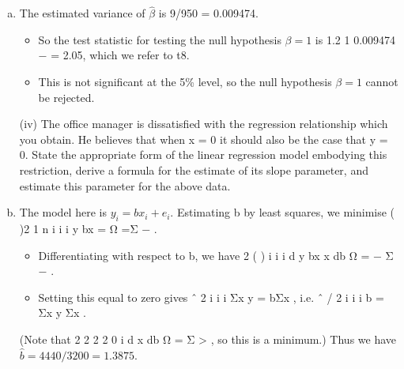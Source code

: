 \documentclass[a4paper,12pt]{article}
\begin{document}
\begin{enumerate}[(a)]
\begin{itemize}
\item so the line is
y = 4 + 1.2x.
\item 
The total sum of squares is ( ) ( )2
2 2 1440
10
i
yy i i
y
S = y − y = y − = Σ Σ Σ .

\item The sum of squares for regression is ˆ
xy β S (or 2 / xy xx S S ) = 1368.
\item Therefore the residual sum of squares is 1440 – 1368 = 72.
\item This has 8 degrees of freedom, so the residual mean square ($\hat{\sigma}^2$ ) is 72/8 = 9.
\item The coefficient of determination $R^2 = 1368/1440 = 0.95$ (usually given as 95\%).
\end{itemize}
\newpage
\begin{framed}

(iii) Given that the variance of the slope estimate is Σ( − )2
2
x x i
σ , where x denotes
the sample mean benchmark time, test at the 5%
hypothesis that the slope of this regression is 1.
(4)

\end{framed}
\item  The estimated variance of $\hat{\beta}$ is 9/950 = 0.009474. 
\begin{itemize}
    \item So the test statistic for
testing the null hypothesis $\beta = 1$ is 1.2 1
0.009474
− = 2.05, which we refer to t8.
\item This is not significant at the 5\% level, so the null hypothesis $\beta = 1$ cannot be rejected.
\end{itemize}
\newpage
\begin{framed}
(iv) The office manager is dissatisfied with the regression relationship which you obtain. He believes that when x = 0 it should also be the case that y = 0. State the appropriate form of the linear regression model embodying this restriction,
derive a formula for the estimate of its slope parameter, and estimate this parameter for the above data.
\end{framed}
\item  The model here is $y_i = bx_i + e_i$.
Estimating b by least squares, we minimise ( )2
1
n
i i
i
y bx
=
Ω =Σ − .
\begin{itemize}
    \item Differentiating with respect to b, we have 2 ( ) i i i
d y bx x
db
Ω = − Σ − .
\item Setting this equal to zero gives ˆ 2
i i i Σx y = bΣx , i.e. ˆ / 2 i i i b = Σx y Σx .
\end{itemize}

(Note that
2
2
2 2 0 i
d x
db
Ω = Σ > , so this is a minimum.)
Thus we have $\hat{b} = 4440/3200 = 1.3875$.
\end{enumerate}
\end{document}
